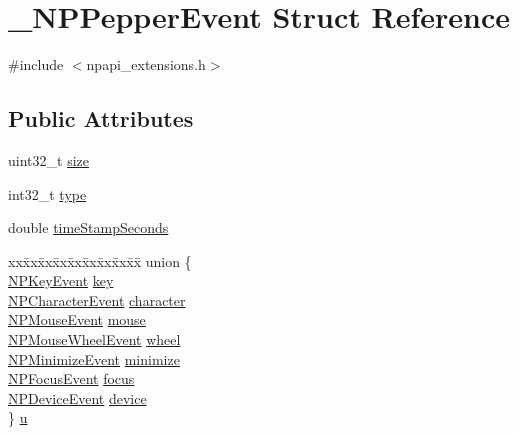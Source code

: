 \hypertarget{struct___n_p_pepper_event}{
\section{\_\-NPPepperEvent Struct Reference}
\label{struct___n_p_pepper_event}
}


{\ttfamily \#include $<$npapi\_\-extensions.h$>$}

\subsection*{Public Attributes}
\begin{DoxyCompactItemize}
\item 
uint32\_\-t \hyperlink{struct___n_p_pepper_event_aa6436fed961910c5be5893569334f937}{size}
\item 
int32\_\-t \hyperlink{struct___n_p_pepper_event_a12e186ade338a56a93d852bdad6f5c7a}{type}
\item 
double \hyperlink{struct___n_p_pepper_event_a1792505a7022b4d29d567c7ba474aa8c}{timeStampSeconds}
\item 
\begin{tabbing}
xx\=xx\=xx\=xx\=xx\=xx\=xx\=xx\=xx\=\kill
union \{\\
\>\hyperlink{struct___n_p_key_event}{NPKeyEvent} \hyperlink{struct___n_p_pepper_event_a2892f0885f8c7e8bed5500472fb16b88}{key}\\
\>\hyperlink{struct___n_p_character_event}{NPCharacterEvent} \hyperlink{struct___n_p_pepper_event_afc0494334dc72989113311fa74a638ec}{character}\\
\>\hyperlink{struct___n_p_mouse_event}{NPMouseEvent} \hyperlink{struct___n_p_pepper_event_aadfc1a87c80619b59daddc56bafe0574}{mouse}\\
\>\hyperlink{struct___n_p_mouse_wheel_event}{NPMouseWheelEvent} \hyperlink{struct___n_p_pepper_event_a8ed6a3d4515f83b58e79c6780a28827f}{wheel}\\
\>\hyperlink{struct___n_p_minimize_event}{NPMinimizeEvent} \hyperlink{struct___n_p_pepper_event_aaf163b2d91536ab2c5a5b06040a3afb9}{minimize}\\
\>\hyperlink{struct___n_p_focus_event}{NPFocusEvent} \hyperlink{struct___n_p_pepper_event_acb9862d36b1248b68657e26c9e59624f}{focus}\\
\>\hyperlink{struct___n_p_device_event}{NPDeviceEvent} \hyperlink{struct___n_p_pepper_event_ad7aeb1cb905712a3155e78d90901c151}{device}\\
\} \hyperlink{struct___n_p_pepper_event_a0b3d13b8bf33be03ad0d9f710a54d423}{u}\\

\end{tabbing}\end{DoxyCompactItemize}


